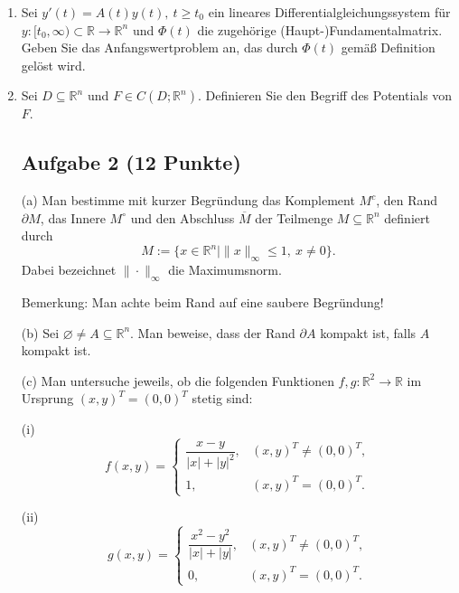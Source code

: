 \begin{enumerate}
\item Sei $y'(t)=A(t)y(t),\ t\ge t_0$ ein lineares Differentialgleichungssystem für $y:[t_0,\infty)\subset \mathbb{R} \to \mathbb{R}^n$ und $\Phi(t)$ die zugehörige (Haupt-)Fundamentalmatrix. Geben Sie das Anfangswertproblem an, das durch $\Phi(t)$ gemäß Definition gelöst wird.\\

\item Sei $D\subseteq\mathbb{R}^n$ und $F\in C(D;\mathbb{R}^n)$. Definieren Sie den Begriff des Potentials von $F$.\\

\newpage
\subsection*{Aufgabe 2 (12 Punkte)}
(a) Man bestimme mit kurzer Begründung das Komplement \(M^{c}\), den Rand \(\partial M\), das Innere \(M^{\circ}\) und den Abschluss \(\overline{M}\) der Teilmenge \(M\subseteq\mathbb{R}^{n}\) definiert durch
\[
M:=\{x\in\mathbb{R}^{n}\mid \|x\|_{\infty}\le 1,\ x\neq 0\}.
\]
Dabei bezeichnet \(\|\cdot\|_{\infty}\) die Maximumsnorm.

Bemerkung: Man achte beim Rand auf eine saubere Begründung!

(b) Sei \(\varnothing\neq A\subseteq\mathbb{R}^{n}\). Man beweise, dass der Rand \(\partial A\) kompakt ist, falls \(A\) kompakt ist. %

(c) Man untersuche jeweils, ob die folgenden Funktionen \(f,g:\mathbb{R}^{2}\to\mathbb{R}\) im Ursprung \((x,y)^{T}=(0,0)^{T}\) stetig sind:

(i)
\[
f(x,y)=
\begin{cases}
\dfrac{x-y}{|x|+|y|^{2}}, & (x,y)^{T}\neq(0,0)^{T},\\[6pt]
1, & (x,y)^{T}=(0,0)^{T}.
\end{cases}
\]

(ii)
\[
g(x,y)=
\begin{cases}
\dfrac{x^{2}-y^{2}}{|x|+|y|}, & (x,y)^{T}\neq(0,0)^{T},\\[6pt]
0, & (x,y)^{T}=(0,0)^{T}.
\end{cases}
\]


\end{enumerate}
